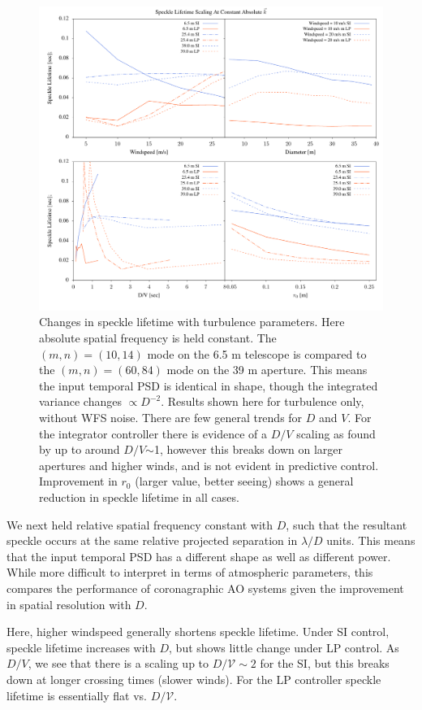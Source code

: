 \documentclass[11pt,preprint]{aastex}
\begin{document}
\begin{figure}
\includegraphics[width=5.5in]{scalings.pdf}
\caption{Changes in speckle lifetime with turbulence parameters.  Here absolute spatial frequency is held constant.  The $(m,n)=(10,14)$ mode on the 6.5 m telescope is compared to the $(m,n)=(60,84)$ mode on the 39 m aperture.  This means the input temporal PSD is identical in shape, though the integrated variance changes $\propto D^{-2}$.  Results shown here for turbulence only, without WFS noise. There are few general trends for $D$ and $V$. For the integrator controller there is evidence of a $D/V$ scaling as found by \citet{2005SPIE.5903..170M} up to around $D/V$$\sim$1, however this breaks down on larger apertures and higher winds, and is not evident in predictive control.  Improvement in $r_0$ (larger value, better seeing) shows a general reduction in speckle lifetime in all cases.
\label{fig:scalings}
}
\end{figure}

We next held relative spatial frequency constant with $D$, such that the resultant speckle occurs at the same relative projected separation in $\lambda/D$ units.  This means that the input temporal PSD has a different shape as well as different power.  While more difficult to interpret in terms of atmospheric parameters, this compares the performance of coronagraphic AO systems given the improvement in spatial resolution with $D$.

Here, higher windspeed generally shortens speckle lifetime.  Under SI control, speckle lifetime increases with $D$, but shows little change under LP control.  As $D/V$, we see that there is a scaling up to $D/\mathcal{V} \sim 2$ for the SI, but this breaks down at longer crossing times (slower winds). For the LP controller speckle lifetime is essentially flat vs. $D/\mathcal{V}$.
\end{document}

